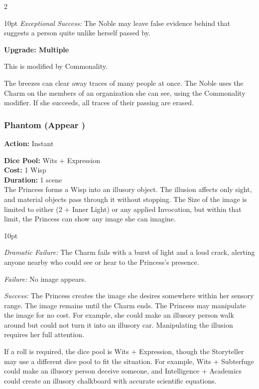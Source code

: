 \begin{multicols}{2}
\begin{myindentpar}{10pt}
\emph{Exceptional Success:} The Noble may leave false evidence behind that suggests a person quite unlike herself passed by.

\textbf{Upgrade: Multiple}

This is modified by Commonality.

The breezes can clear away traces of many people at once. The Noble uses the Charm on the members of an organization she can see, using the Commonality modifier. If she succeeds, all traces of their passing are erased.

\end{myindentpar}

\subsubsection*{Phantom (Appear \textbullet\textbullet)}
\noindent \textbf{Action:} Instant

\noindent \textbf{Dice Pool:} Wits + Expression \\

\noindent \textbf{Cost:} 1 Wisp\\

\noindent \textbf{Duration:} 1 scene\\

\noindent The Princess forms a Wisp into an illusory object. The illusion affects only sight, and material objects pass through it without stopping. The Size of the image is limited to either (2 + Inner Light) or any applied Invocation, but within that limit, the Princess can show any image she can imagine.

\begin{myindentpar}{10pt}

\emph{Dramatic Failure:} The Charm fails with a burst of light and a loud crack, alerting anyone nearby who could see or hear to the Princess's presence.

\emph{Failure:} No image appears.

\emph{Success:} The Princess creates the image she desires somewhere within her sensory range. The image remains until the Charm ends. The Princess may manipulate the image for no cost. For example, she could make an illusory person walk around but could not turn it into an illusory car. Manipulating the illusion requires her full attention.

If a roll is required, the dice pool is Wits + Expression, though the Storyteller may use a different dice pool to fit the situation. For example, Wits + Subterfuge could make an illusory person deceive someone, and Intelligence + Academics could create an illusory chalkboard with accurate scientific equations. 


\end{myindentpar}
\end{multicols}
